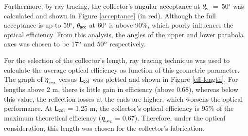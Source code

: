 

Furthermore, by ray tracing, the collector's angular acceptance at \mbox{$\theta_{\!_{\rm{P2}}}$ = 50$^{\circ}$} was calculated and shown in Figure \ref{acceptance} (in red). Although the full acceptance is up to 59$^{\circ}$, $\rm{\theta_{acc}}$ at 60$^{\circ}$ is above 90\%, which poorly influences the optical efficiency. From this analysis, the angles of the upper and lower parabola axes was chosen to be 17$^{\rm o}$ and 50$^{\rm o}$ respectively. 





For the selection of the collector's length, ray tracing technique was used to calculate the average optical efficiency as function of this geometric parameter. The graph of $\rm{\eta_{\!_{o,avg}}}$ versus $\rm{L_{col}}$ was plotted and shown in Figure \ref{eff-length}. For lengths above 2 m, there is little gain in efficiency (above 0.68), whereas below this value, the reflection losses at the ends are higher, which worsens the optical performance. At $\rm{L_{col}}$ = 1.25 m, the collector's optical efficiency is 95\% of the maximum theoretical efficiency ($\rm{\eta_{\!_{o,avg}}}$ = 0.67). Therefore, under the optical consideration, this length was chosen for the collector's fabrication.


